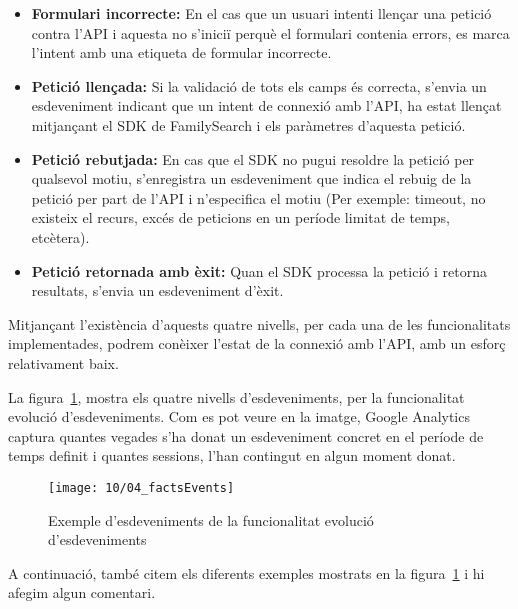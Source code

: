     \begin{itemize}
        \item \textbf{Formulari incorrecte:} En el cas que un usuari intenti llençar una petició contra l'API i aquesta no s'iniciï perquè el formulari contenia errors, es marca l'intent amb una etiqueta de formular incorrecte.
        \item \textbf{Petició llençada:} Si la validació de tots els camps és correcta, s'envia un esdeveniment indicant que un intent de connexió amb l'API, ha estat llençat mitjançant el SDK de FamilySearch i els paràmetres d'aquesta petició.
        \item \textbf{Petició rebutjada:} En cas que el SDK no pugui resoldre la petició per qualsevol motiu, s'enregistra un esdeveniment que indica el rebuig de la petició per part de l'API i n'especifica el motiu (Per exemple: timeout, no existeix el recurs, excés de peticions en un període limitat de temps, etcètera).
        \item \textbf{Petició retornada amb èxit:} Quan el SDK processa la petició i retorna resultats, s'envia un esdeveniment d'èxit.
    \end{itemize}

    Mitjançant l'existència d'aquests quatre nivells, per cada una de les funcionalitats implementades, podrem conèixer l'estat de la connexió amb l'API, amb un esforç relativament baix.

    La figura~\ref{img:factsEvents}, mostra els quatre nivells d'esdeveniments, per la funcio\-na\-litat evolució d'esdeveniments. Com es pot veure en la imatge, Google Analytics captura quantes vegades s'ha donat un esdeveniment concret en el període de temps definit i quantes sessions, l'han contingut en algun moment donat.

    \begin{figure}[h]
        \texttt{[image: 10/04\_factsEvents]}
        \centering
        \caption{Exemple d'esdeveniments de la funcionalitat evolució d'esdeveniments}\label{img:factsEvents}
    \end{figure}

    A continuació, també citem els diferents exemples mostrats en la figura~\ref{img:factsEvents} i hi afegim algun comentari.

